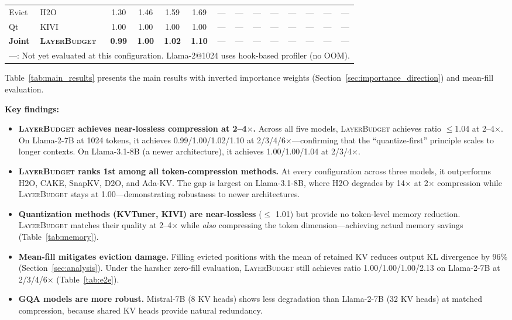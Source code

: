 \documentclass{article}
\newcommand{\layerbudget}{\textsc{LayerBudget}\xspace}
\begin{document}
\begin{table}[t]
\begin{tabular}{@{}llcccccccccccc@{}}
\midrule
Evict & H2O & 1.30 & 1.46 & 1.59 & 1.69 & --- & --- & --- & --- & --- & --- & --- & --- \\
Qt & KIVI & 1.00 & 1.00 & 1.00 & 1.00 & --- & --- & --- & --- & --- & --- & --- & --- \\
\midrule
\textbf{Joint} & \textbf{\layerbudget} & \textbf{0.99} & \textbf{1.00} & \textbf{1.02} & \textbf{1.10} & --- & --- & --- & --- & --- & --- & --- & --- \\
\bottomrule
\multicolumn{14}{l}{\scriptsize ---: Not yet evaluated at this configuration. Llama-2@1024 uses hook-based profiler (no OOM).}
\end{tabular}
\vspace{-0.05in}
\end{table}

Table~\ref{tab:main_results} presents the main results with inverted importance weights (Section~\ref{sec:importance_direction}) and mean-fill evaluation.

\textbf{Key findings:}
\begin{itemize}
    \item \textbf{\layerbudget achieves near-lossless compression at 2--4$\times$.}
    Across all five models, \layerbudget achieves ratio $\leq$1.04 at 2--4$\times$.
    On Llama-2-7B at 1024 tokens, it achieves 0.99/1.00/1.02/1.10 at 2/3/4/6$\times$---confirming that the ``quantize-first'' principle scales to longer contexts.
    On Llama-3.1-8B (a newer architecture), it achieves 1.00/1.00/1.04 at 2/3/4$\times$.
    \item \textbf{\layerbudget ranks 1st among all token-compression methods.}
    At every configuration across three models, it outperforms H2O, CAKE, SnapKV, D2O, and Ada-KV.
    The gap is largest on Llama-3.1-8B, where H2O degrades by 14$\times$ at 2$\times$ compression while \layerbudget stays at 1.00---demonstrating robustness to newer architectures.
    \item \textbf{Quantization methods (KVTuner, KIVI) are near-lossless} ($\leq$ 1.01) but provide no token-level memory reduction.
    \layerbudget matches their quality at 2--4$\times$ while \emph{also} compressing the token dimension---achieving actual memory savings (Table~\ref{tab:memory}).
    \item \textbf{Mean-fill mitigates eviction damage.}
    Filling evicted positions with the mean of retained KV reduces output KL divergence by 96\% (Section~\ref{sec:analysis}).
    Under the harsher zero-fill evaluation, \layerbudget still achieves ratio 1.00/1.00/1.00/2.13 on Llama-2-7B at 2/3/4/6$\times$ (Table~\ref{tab:e2e}).
    \item \textbf{GQA models are more robust.} Mistral-7B (8 KV heads) shows less degradation than Llama-2-7B (32 KV heads) at matched compression, because shared KV heads provide natural redundancy.
\end{itemize}
\end{document}
